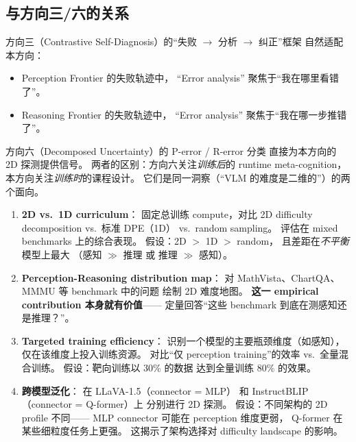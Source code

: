 \documentclass[12pt,a4paper]{article}
\begin{document}
\subsection{与方向三/六的关系}

方向三（Contrastive Self-Diagnosis）的``失败 $\rightarrow$ 分析 $\rightarrow$ 纠正''框架
自然适配本方向：
\begin{itemize}[leftmargin=2em]
  \item Perception Frontier 的失败轨迹中，
    ``Error analysis'' 聚焦于``我在哪里看错了''。
  \item Reasoning Frontier 的失败轨迹中，
    ``Error analysis'' 聚焦于``我在哪一步推错了''。
\end{itemize}

\noindent
方向六（Decomposed Uncertainty）的 P-error / R-error 分类
直接为本方向的 2D 探测提供信号。
两者的区别：方向六关注\textit{训练后}的 runtime meta-cognition，
本方向关注\textit{训练时}的课程设计。
它们是同一洞察（``VLM 的难度是二维的''）的两个面向。

\begin{expbox}
\begin{enumerate}[leftmargin=1.5em]
  \item \textbf{2D vs.\ 1D curriculum}：
    固定总训练 compute，对比
    2D difficulty decomposition vs.\ 标准 DPE（1D）
    vs.\ random sampling。
    评估在 mixed benchmarks 上的综合表现。
    假设：2D $>$ 1D $>$ random，
    且差距在\textit{不平衡}模型上最大
    （感知 $\gg$ 推理 或 推理 $\gg$ 感知）。

  \item \textbf{Perception-Reasoning distribution map}：
    对 MathVista、ChartQA、MMMU 等 benchmark 中的问题
    绘制 2D 难度地图。
    \textbf{这一 empirical contribution 本身就有价值}——
    定量回答``这些 benchmark 到底在测感知还是推理？''。

  \item \textbf{Targeted training efficiency}：
    识别一个模型的主要瓶颈维度（如感知），
    仅在该维度上投入训练资源。
    对比``仅 perception training''的效率
    vs.\ 全量混合训练。
    假设：靶向训练以 30\% 的数据
    达到全量训练 80\% 的效果。

  \item \textbf{跨模型泛化}：
    在 LLaVA-1.5（connector = MLP）
    和 InstructBLIP（connector = Q-former）上
    分别进行 2D 探测。
    假设：不同架构的 2D profile 不同——
    MLP connector 可能在 perception 维度更弱，
    Q-former 在某些细粒度任务上更强。
    这揭示了架构选择对 difficulty landscape 的影响。
\end{enumerate}
\end{expbox}
\end{document}
